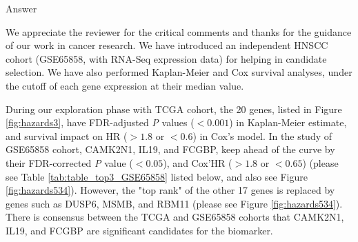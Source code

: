 \documentclass[preprint,12pt]{elsarticle}
\newenvironment{MyColorPar}[1]{%
    \leavevmode\color{#1}\ignorespaces%
}{%
}%
\begin{document}
%
\begin{MyColorPar}{blue}
Answer


We appreciate the reviewer for the critical comments and thanks for the guidance of our work in cancer research.
We have introduced an independent HNSCC cohort (GSE65858, with RNA-Seq expression data) for helping in candidate selection.
We have also performed Kaplan-Meier and Cox survival analyses, under the cutoff of each gene expression at their median value.

During our exploration phase with TCGA cohort, the 20 genes, listed
in Figure \ref{fig:hazards3}, have FDR-adjusted \textit{P} values ($<0.001$) in Kaplan-Meier estimate, and survival impact on HR ($> 1.8$ or $< 0.6$) in Cox's model.
%
In the study of GSE65858 cohort, CAMK2N1, IL19, and FCGBP, keep ahead of the curve by their FDR-corrected \textit{P} value ($< 0.05$), and Cox'HR ($>1.8$ or $<0.65$) (please see Table \ref{tab:table_top3_GSE65858} listed below,
and also see Figure \ref{fig:hazards534}).
However, the "top rank" of the other 17 genes is replaced by genes such as DUSP6, MSMB, and RBM11 (please see Figure \ref{fig:hazards534}).
There is consensus between the TCGA and GSE65858 cohorts that CAMK2N1, IL19, and FCGBP are significant candidates for the biomarker.


\end{MyColorPar}
\end{document}
